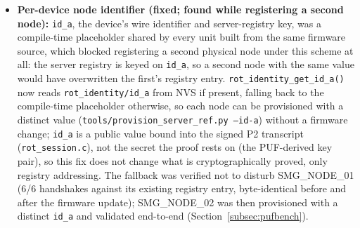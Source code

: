 \documentclass[preprint,12pt,authoryear]{elsarticle}
\begin{document}
\begin{sloppypar}
\begin{itemize}[leftmargin=*]
    \item \textbf{Per-device node identifier (fixed; found while registering a second node):} \texttt{id\_a}, the device's wire identifier and server-registry key, was a compile-time placeholder shared by every unit built from the same firmware source, which blocked registering a second physical node under this scheme at all: the server registry is keyed on \texttt{id\_a}, so a second node with the same value would have overwritten the first's registry entry. \texttt{rot\_identity\_get\_id\_a()} now reads \texttt{rot\_identity/id\_a} from NVS if present, falling back to the compile-time placeholder otherwise, so each node can be provisioned with a distinct value (\texttt{tools/provision\_server\_ref.py --id-a}) without a firmware change; \texttt{id\_a} is a public value bound into the signed P2 transcript (\texttt{rot\_session.c}), not the secret the proof rests on (the PUF-derived key pair), so this fix does not change what is cryptographically proved, only registry addressing. The fallback was verified not to disturb SMG\_NODE\_01 (6/6 handshakes against its existing registry entry, byte-identical before and after the firmware update); SMG\_NODE\_02 was then provisioned with a distinct \texttt{id\_a} and validated end-to-end (Section~\ref{subsec:pufbench}).

\end{itemize}
\end{sloppypar}
\end{document}
